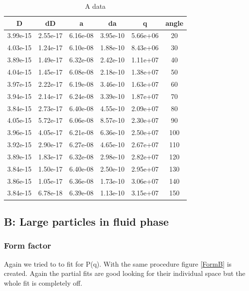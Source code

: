 \documentclass[]{article}
\begin{document}
\begin{table}[h]
	\centering
	\begin{tabular}{|c|c|c|c|c|c|}
		\hline
		D & dD & a & da & q & angle \\ \hline\hline
		3.99e-15 & 2.55e-17 & 6.16e-08 & 3.95e-10 & 5.66e+06 & 20 \\ \hline
		4.03e-15 & 1.24e-17 & 6.10e-08 & 1.88e-10 & 8.43e+06 & 30 \\ \hline
		3.89e-15 & 1.49e-17 & 6.32e-08 & 2.42e-10 & 1.11e+07 & 40 \\ \hline
		4.04e-15 & 1.45e-17 & 6.08e-08 & 2.18e-10 & 1.38e+07 & 50 \\ \hline
		3.97e-15 & 2.22e-17 & 6.19e-08 & 3.46e-10 & 1.63e+07 & 60 \\ \hline
		3.94e-15 & 2.14e-17 & 6.24e-08 & 3.39e-10 & 1.87e+07 & 70 \\ \hline
		3.84e-15 & 2.73e-17 & 6.40e-08 & 4.55e-10 & 2.09e+07 & 80 \\ \hline
		4.05e-15 & 5.72e-17 & 6.06e-08 & 8.57e-10 & 2.30e+07 & 90 \\ \hline
		3.96e-15 & 4.05e-17 & 6.21e-08 & 6.36e-10 & 2.50e+07 & 100 \\ \hline
		3.92e-15 & 2.90e-17 & 6.27e-08 & 4.65e-10 & 2.67e+07 & 110 \\ \hline
		3.89e-15 & 1.83e-17 & 6.32e-08 & 2.98e-10 & 2.82e+07 & 120 \\ \hline
		3.84e-15 & 1.50e-17 & 6.40e-08 & 2.50e-10 & 2.95e+07 & 130 \\ \hline
		3.86e-15 & 1.05e-17 & 6.36e-08 & 1.73e-10 & 3.06e+07 & 140 \\ \hline
		3.84e-15 & 6.78e-18 & 6.39e-08 & 1.13e-10 & 3.15e+07 & 150 \\ \hline
		\hline
	\end{tabular}
	\caption{A data}
	\label{tab:adata}
\end{table}



\subsection{B: Large particles in fluid phase}
\subsubsection{Form factor}
Again we tried to to fit for P(q). With the same procedure figure \ref{FormB} is created. Again the partial fits are good looking for their individual space but the whole fit is completely off.
\end{document}
